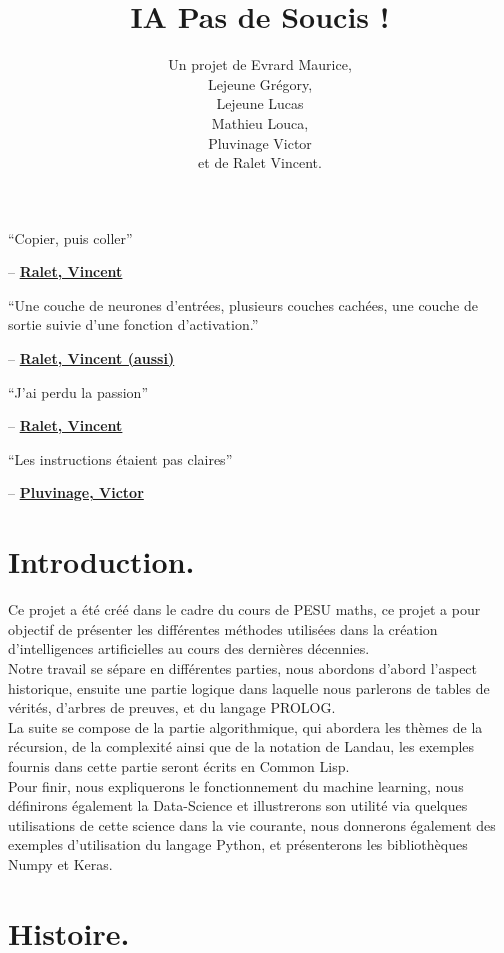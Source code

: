 \documentclass[a4paper, 12pt]{article}
\title{IA Pas de Soucis !}
\author{Un projet de Evrard Maurice,\\ Lejeune Grégory,\\ Lejeune Lucas \\ Mathieu Louca,\\ Pluvinage Victor\\ et de Ralet Vincent.}
\numberwithin{equation}{subsection}
\begin{document}
\onehalfspacing
\maketitle
\newpage
\tableofcontents
\newpage
``Copier, puis coller''
\begin{flushright}
  -- \underline{\bf Ralet, Vincent}
\end{flushright}
  ``Une couche de neurones d’entrées, plusieurs couches cachées, une couche de sortie suivie d’une fonction d’activation.''
\begin{flushright}
  -- \underline{{\bf Ralet, Vincent (aussi)}}
\end{flushright}
``J'ai perdu la passion''
\begin{flushright}
  -- \underline{{\bf Ralet, Vincent}}
\end{flushright}
``Les instructions étaient pas claires''
\begin{flushright}
  -- \underline{{\bf Pluvinage, Victor}}
\end{flushright}
\section{Introduction.}
Ce projet a été créé dans le cadre du cours de PESU maths, ce projet a pour objectif de présenter les différentes méthodes utilisées dans la création d'intelligences artificielles au cours des dernières décennies.\\

Notre travail se sépare en différentes parties, nous abordons d'abord l'aspect historique, ensuite une partie logique dans laquelle nous parlerons de tables de vérités, d'arbres de preuves, et du langage PROLOG.\\

La suite se compose de la partie algorithmique, qui abordera les thèmes de la récursion, de la complexité ainsi que de la notation de Landau, les exemples fournis dans cette partie seront écrits en Common Lisp.\\

Pour finir, nous expliquerons le fonctionnement du machine learning, nous définirons également la Data-Science et illustrerons son utilité via quelques utilisations de cette science dans la vie courante,
nous donnerons également des exemples d'utilisation du langage Python, et présenterons les bibliothèques Numpy et Keras.\\
\newpage
\section{Histoire.}
\end{document}
